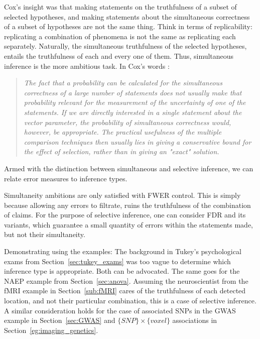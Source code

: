 \documentclass[review,12pt]{article}
\theoremstyle{definition}
\theoremstyle{definition}
\begin{document}
Cox's insight was that making statements on the truthfulness of a subset of selected hypotheses, and making statements about the simultaneous correctness of a subset of hypotheses are not the same thing. 
Think in terms of replicability: replicating a combination of phenomena is not the same as replicating each separately.
Naturally, the simultaneous truthfulness of the selected hypotheses, entails the truthfulness of each and every one of them. Thus, simultaneous inference is the more ambitious task.
In  Cox's words \cite{cox_remark_1965}:
\begin{quote}\em
The fact that a probability can be calculated for the simultaneous correctness of a large number of statements does not usually make that probability relevant for the measurement of
the uncertainty of one of the statements. If we are directly interested in a single statement about the vector parameter, the probability of simultaneous correctness would, however, be appropriate. The practical usefulness of the multiple comparison techniques then usually lies in giving a conservative bound for the effect of selection, rather than in giving an "exact" solution.
\end{quote}

Armed with the distinction between simultaneous and selective inference, we can relate error measures to inference types. 

Simultaneity ambitions are only satisfied with FWER control. This is simply because allowing any errors to filtrate, ruins the truthfulness of the combination of claims.
For the purpose of selective inference, one can consider FDR and its variants, which guarantee a small quantity of errors within the statements made, but not their simultaneity.

Demonstrating using the examples: 
The background in Tukey's psychological exams from Section~\ref{sec:tukey_exams} was too vague to determine which inference type is appropriate. Both can be advocated. 
The same goes for the NAEP example from Section~\ref{sec:anova}. 
Assuming the neuroscientist from the fMRI example in Section~\ref{sub:fMRI} cares of the truthfulness of each detected location, and not their particular combination, this is a case of selective inference. A similar consideration holds for the case of associated SNPs in the GWAS example in Section~\ref{sec:GWAS} and $\{SNP\} \times \{voxel\}$ associations in Section~\ref{eg:imaging_genetics}.
\end{document}
